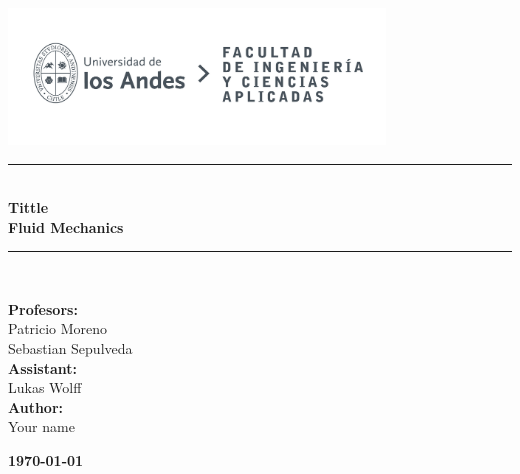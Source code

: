 \documentclass{article} %
\begin{document}
\begin{titlepage}%
\newcommand{\HRule}{\rule{\linewidth}{0.5mm}} 
\center 
\includegraphics[width=10cm]{LOGO_UNIVERSIDAD.jpg}\\ %
\vspace{3cm}
\HRule \\[0.4cm]
{ \huge \bfseries Tittle}\\[0.4cm] %
{ \huge \bfseries Fluid Mechanics}\\[0.4cm] %
\HRule \\[1.5cm]
 \vspace{5cm}
\begin{flushright}
    { \textbf{Profesors:}\\
    Patricio Moreno\\
    Sebastian Sepulveda\\
    \vspace{0.2cm}
    \textbf{Assistant:}\\
    Lukas Wolff\\
    \vspace{0.2cm}
    \textbf{Author:}\\
    Your name\\
}
\end{flushright}
\vspace{1cm}
{\large \textbf{\today}}\\[2cm] %
\end{titlepage}
\end{document}
